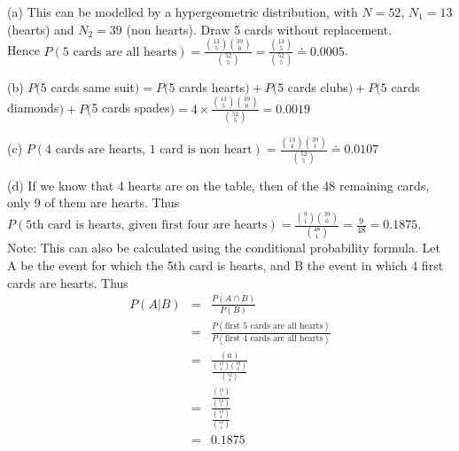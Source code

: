 \documentclass[bigtut]{tutorial}\usepackage[]{graphicx}\usepackage[]{color}
\begin{document}
\begin{tutorial}
\begin{questions}


\begin{solution}
(a)
This can be modelled by a hypergeometric distribution, with $N=52$, $N_{1} = 13$ (hearts) and $N_{2} = 39$ (non hearts). Draw 5 cards without replacement. \\
Hence $P( \text{5 cards are all hearts}) = \frac{ {13 \choose 5} {39 \choose 0} } { {52 \choose 5} } = \frac{ {13 \choose 5} }{ {52 \choose 5} } \doteq 0.0005$.

\vspace{.5cm}
(b)
$P($5 cards same suit$) = P($5 cards hearts$) + P($5 cards clubs$) + P($5 cards diamonds$) + P($5 cards spades$) = 4 \times \frac{{13 \choose 5}{39 \choose 0}}{{52 \choose 5}} = 0.0019$

\vspace{.5cm}
(c)
$P(\text{4 cards are hearts, 1 card is non heart}) =
\frac{ {13 \choose 4} {39 \choose 1} }{{52 \choose 5}} \doteq 0.0107$

\vspace{.5cm}
(d)
If we know that 4 hearts are on the table, then of the 48 remaining cards, only 9 of them are hearts. Thus $P(\text{5th card is hearts, given first four are hearts} ) = \frac{ {9 \choose 1}{39 \choose 0} }{{48 \choose 1}} =\frac{9}{48} = 0.1875$.\\

Note: This can also be calculated using the conditional probability formula. Let A be the event for which the 5th card is hearts, and B the event in which 4 first cards are hearts. Thus
\begin{eqnarray*}
P(A|B) &=&  \frac{P(A \cap B)}{P(B) } \\
& = & \frac{ P(\text{first 5 cards are all hearts} ) }{            P(\text{first 4 cards are all hearts}) } \\
&=&  \frac{(a)}{ \frac{ {13 \choose 4}{39 \choose 0} }{{52 \choose 4} } } \\
& = & \frac{ \frac{ {13 \choose 5} }{ {52 \choose 5} }  }{ \frac{ {13 \choose 4} }{{52 \choose 4} } } \\   
 &=& 0.1875
\end{eqnarray*}


\end{solution}
\end{questions}
\end{tutorial}
\end{document}
